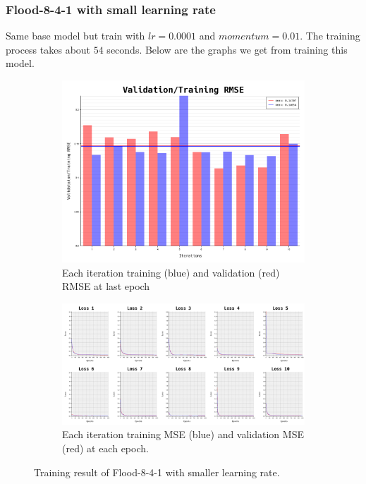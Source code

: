 \documentclass{article}
\begin{document}
\newpage
\subsubsection*{Flood-8-4-1 with small learning rate}
Same base model but train with $lr = 0.0001$ and $momentum = 0.01$.
The training process takes about $54$ seconds.
Below are the graphs we get from training this model. 
\begin{figure}[ht]
	\begin{subfigure}{\textwidth}
		\centering
		\includegraphics[scale=0.3]{flood-8-4-1_3/cv_l}
		\caption{Each iteration training (blue) and validation (red) RMSE at last epoch}
		\label{fig:4a}
	\end{subfigure}
	\begin{subfigure}{\textwidth}
		\includegraphics[width=\textwidth]{flood-8-4-1_3/loss}
		\caption{Each iteration training MSE (blue) and validation MSE (red) at each epoch.}
		\label{fig:4b}
	\end{subfigure}
	\caption{Training result of Flood-8-4-1 with smaller learning rate.}
	\label{fig:4}
\end{figure}
\FloatBarrier
\end{document}
